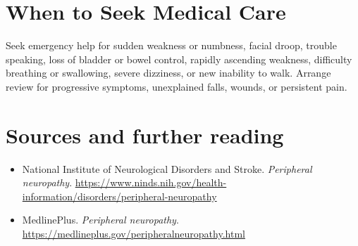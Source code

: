 \section*{When to Seek Medical Care}
Seek emergency help for sudden weakness or numbness, facial droop, trouble speaking, loss of bladder or bowel control, rapidly ascending weakness, difficulty breathing or swallowing, severe dizziness, or new inability to walk. Arrange review for progressive symptoms, unexplained falls, wounds, or persistent pain.

\section*{Sources and further reading}
\begin{itemize}
\item National Institute of Neurological Disorders and Stroke. \textit{Peripheral neuropathy}. \url{https://www.ninds.nih.gov/health-information/disorders/peripheral-neuropathy}
\item MedlinePlus. \textit{Peripheral neuropathy}. \url{https://medlineplus.gov/peripheralneuropathy.html}
\end{itemize}
